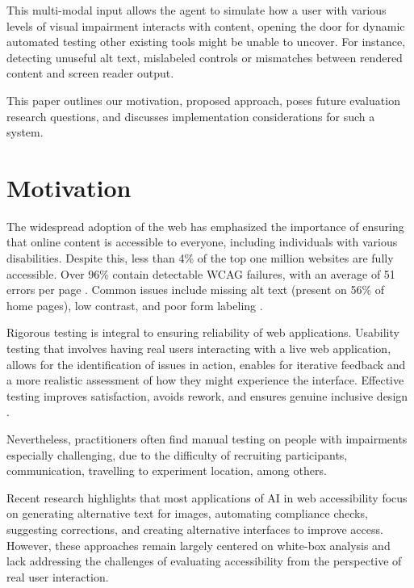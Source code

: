 This multi-modal input allows the agent to simulate how a user with various levels of visual impairment interacts with content, opening the door for dynamic automated testing other existing tools might be unable to uncover. For instance, detecting unuseful alt text, mislabeled controls or mismatches between rendered content and screen reader output. 

This paper outlines our motivation, proposed approach, poses future evaluation research questions, and discusses implementation considerations for such a system.

\section{Motivation}

The widespread adoption of the web has emphasized the importance of ensuring that online content is accessible to everyone, including individuals with various disabilities\cite{abu2023web}. Despite this, less than 4\% of the top one million websites are fully accessible. Over 96\% contain detectable \ac{WCAG} failures, with an average of 51 errors per page \cite{webaimmillion2025}. Common issues include missing alt text (present on 56\% of home pages), low contrast, and poor form labeling \cite{audioeye2024}.

Rigorous testing is integral to ensuring reliability of web applications. Usability testing that involves having real users interacting with a live web application, allows for the identification of issues in action, enables for iterative feedback and a more realistic assessment of how they might experience the interface. Effective testing improves satisfaction, avoids rework, and ensures genuine inclusive design \cite{accessdesign2025}. 

Nevertheless, practitioners often find manual testing on people with impairments especially challenging, due to the difficulty of recruiting participants, communication, travelling to experiment location, among others\cite{xu2025conducting}.

Recent research highlights that most applications of \ac{AI} in web accessibility focus on generating alternative text for images, automating compliance checks, suggesting corrections, and creating alternative interfaces to improve access\cite{vera2025towards}. However, these approaches remain largely centered on white-box analysis and lack addressing the challenges of evaluating accessibility from the perspective of real user interaction. 


